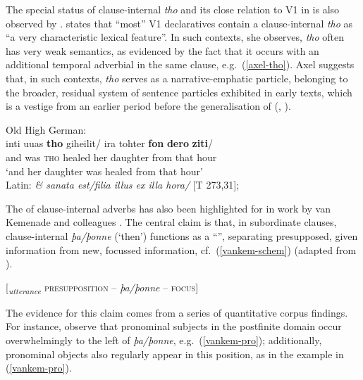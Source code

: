 \documentclass[output=paper,colorlinks,citecolor=brown]{langscibook}
\begin{document}
The special status of clause-internal \textit{tho} and its close relation to V1 in  is also observed by \citet{Axel2007,axel2009verb}. \citet[156, 167]{Axel2007} states that ``most''  V1 declaratives contain a clause-internal \textit{tho} as ``a very characteristic lexical feature''. In such contexts, she observes, \textit{tho} often has very weak semantics, as evidenced by the fact that it occurs with an additional temporal adverbial in the same clause, e.g.~(\ref{axel-tho}). Axel suggests that, in such contexts, \textit{tho} serves as a narrative-emphatic particle, belonging to the broader, residual system of sentence particles exhibited in early  texts, which is a vestige from an earlier period before the generalisation of  (\citealp[169--170]{Axel2007}, \citealp[35--36]{axel2009verb}). 

\ea\label{axel-tho} Old High German:\\
\gll inti uuas \textbf{tho} giheilit/ ira tohter \textbf{fon} \textbf{dero} \textbf{ziti}/\\
and was \textsc{tho} healed her daughter from that hour\\
\glt `and her daughter was healed from that hour'\\
Latin: \textit{\& sanata est/filia illus ex illa hora/} \hfill  [T 273,31]; \citep[156]{Axel2007}
\z 

The  of clause-internal adverbs has also been highlighted for  in work by van Kemenade and colleagues \citep{vanKem-Los2006,vanKem2008balance,vanKemenade2009discourse,vanKem2011syntax,vanKem2020discourse}. The central claim is that, in subordinate clauses, clause-internal \textit{þa/þonne} (`then') functions as a ``'', separating presupposed, given information from new, focussed information, cf.~(\ref{vankem-schem}) (adapted from \citealp[10]{vanKem2008balance}).

\ea \label{vankem-schem} [\textsubscript{\textit{utterance}} \textsc{presupposition} -- \textit{þa/þonne} -- \textsc{focus}]
\z 

\noindent The evidence for this claim comes from a series of quantitative corpus findings. For instance, \citet[232]{vanKem-Los2006} observe that pronominal subjects in the postfinite domain occur overwhelmingly to the left of \textit{þa/þonne}, e.g.~(\ref{vankem-pro}); additionally, pronominal objects also regularly appear in this position, as in the example in (\ref{vankem-pro}).
\end{document}
